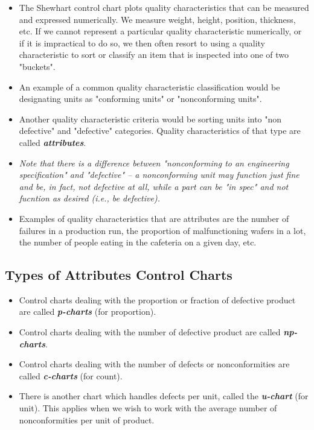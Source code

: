 \documentclass[MASTER-SPC.tex]{subfiles}
\begin{document}
\begin{itemize}
	\item The Shewhart control chart plots quality characteristics that can be measured and expressed numerically. We measure weight, height, position, thickness, etc. If we cannot represent a particular quality characteristic numerically, or if it is impractical to do so, we then often resort to using a quality characteristic to sort or classify an item that is inspected into one of two "buckets".
	\item  An example of a common quality characteristic classification would be designating units as "conforming units" or "nonconforming units". 
	\item Another quality characteristic criteria would be sorting units into "non defective" and "defective" categories. Quality characteristics of that type are called \textit{\textbf{attributes}}.
	
	\item \textit{Note that there is a difference between "nonconforming to an engineering specification" and "defective" -- a nonconforming unit may function just fine and be, in fact, not defective at all, while a part can be "in spec" and not fucntion as desired (i.e., be defective).}
	
	\item Examples of quality characteristics that are attributes are the number of failures in a production run, the proportion of malfunctioning wafers in a lot, the number of people eating in the cafeteria on a given day, etc.
\end{itemize}
\subsection{Types of Attributes Control Charts}

\begin{itemize}
	\item Control charts dealing with the proportion or fraction of defective product are called  \textbf{\textit{p-charts}} (for proportion).
	\item Control charts dealing with the number of defective product are called  \textbf{\textit{np-charts}}.
	\item Control charts dealing with the number of defects or nonconformities are called \textbf{\textit{c-charts}} (for count).
	\item There is another chart which handles defects per unit, called the \textbf{\textit{u-chart}} (for unit). This applies when we wish to work with the average number of nonconformities per unit of product.
\end{itemize}
\end{document}
